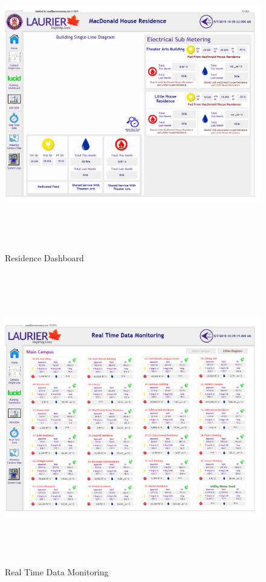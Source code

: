	\begin{center}
	\begin{figure}
			\includegraphics[height=5in]{../Images/WLU4.png}
		\caption{Residence Dashboard}
		\label{fig:ResidenceDashboard}
	\end{figure}
	\end{center}


	\begin{center}
	\begin{figure}
			\includegraphics[height=5in]{../Images/WLU5.png}
		\caption{Real Time Data Monitoring}
		\label{fig:RealTimeDataMonitoring}
	\end{figure}
	\end{center}


